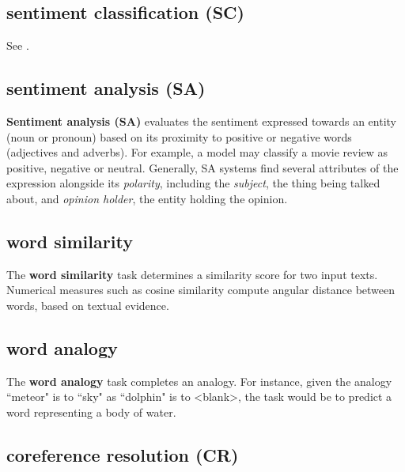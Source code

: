 
\subsection{sentiment classification (SC)} \label{nlptask:sentimentclassificationSC}

See .

\subsection{sentiment analysis (SA)} \label{nlptask:sentimentanalysisSA}

\textbf{Sentiment analysis (SA)} evaluates the sentiment expressed towards an entity (noun or pronoun) based on its proximity to positive or negative words (adjectives and adverbs). For example, a model may classify a movie review as positive, negative or neutral. Generally, SA systems find several attributes of the expression alongside its \emph{polarity}, including the \emph{subject}, the thing being talked about, and \emph{opinion holder}, the entity holding the opinion. 



\subsection{word similarity} \label{nlptask:wordsimilarity}

The \textbf{word similarity} task determines a similarity score for two input texts. Numerical measures such as cosine similarity compute angular distance between words, based on textual evidence. 


\subsection{word analogy} \label{nlptask:wordanalogy}

The \textbf{word analogy} task completes an analogy. For instance, given the analogy ``meteor" is to ``sky" as ``dolphin" is to <blank>, the task would be to predict a word representing a body of water. 


\subsection{coreference resolution (CR)} \label{nlptask:coreferenceresolutionCR}

